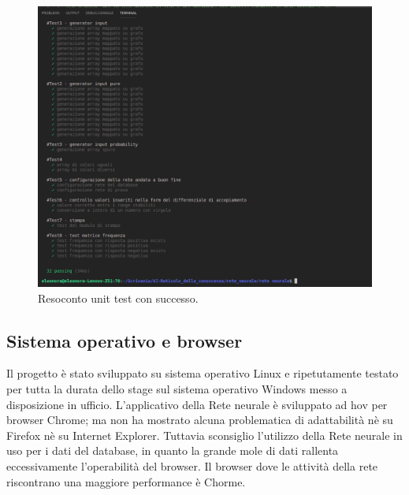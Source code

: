 \begin{figure}[H]
\centering
	\includegraphics[width=0.80\linewidth]{./image/recap_test.png}
	\caption{Resoconto unit test con successo.}
	\label{Resoconto unit test con successo.}
\end{figure}
\noindent

\subsection{Sistema operativo e browser}
Il progetto \`e stato sviluppato su sistema operativo Linux e ripetutamente testato per tutta la durata dello stage sul sistema operativo Windows messo a disposizione in ufficio. L'applicativo della Rete neurale \`e sviluppato ad hov per browser Chrome; ma non ha mostrato alcuna problematica di adattabilit\`a n\`e su Firefox n\`e su Internet Explorer. Tuttavia sconsiglio l'utilizzo della Rete neurale in uso per i dati del database, in quanto la grande mole di dati rallenta eccessivamente l'operabilit\`a del browser. Il browser dove le attivit\`a della rete riscontrano una maggiore performance \`e Chorme.